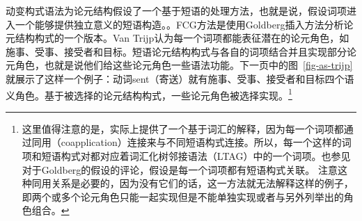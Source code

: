 动变构式语法为论元结构假设了一个基于短语的处理方法，也就是说，假设词项进入一个能够提供独立意义的短语构造。\citep{vanTrijp2011a}。FCG方法是使用Goldberg插入方法分析论元结构构式的一个版本\citep{Goldberg95a}。Van Trijp认为每一个词项都能表征潜在的论元角色，如施事、受事、接受者和目标。短语论元结构构式与各自的词项结合并且实现部分论元角色，也就是说他们给这些论元角色一些语法功能。下一页中的图~\vref{fig-as-trijp}就展示了这样一个例子：动词sent（寄送）就有施事、受事、接受者和目标四个语义角色。基于被选择的论元结构构式，一些论元角色被选择实现。\footnote{%
这里值得注意的是，\citet[]{vanTrijp2011a}实际上提供了一个基于词汇的解释，因为每一个词项都通过同用（coapplication）连接来与不同短语构式连接。所以，每一个这样的词项和短语构式对都对应着词汇化树邻接语法（LTAG）中的一个词项。也参见对于Goldberg的假设的评论，假设是每一个词项都有短语构式关联。
注意这种同用关系是必要的，因为没有它们的话，这一方法就无法解释这样的例子，即两个或多个论元角色只能一起实现但是不能单独实现或者与另外列举出的角色组合。
}

